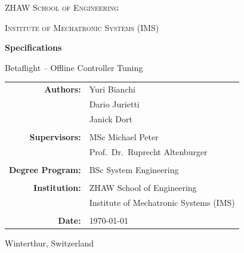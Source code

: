 \documentclass[a4paper,11pt,bibliography=totoc,listof=totoc]{scrreprt}
\begin{document}
\begin{titlepage}

\centering

\vspace*{2cm}

{\scshape\LARGE ZHAW School of Engineering \par}
\vspace{0.5cm}
{\scshape\Large Institute of Mechatronic Systems (IMS)\par}

\vspace{2.5cm}

{\huge\bfseries Specifications\par}

\vspace{0.5cm}

{\Large Betaflight – Offline Controller Tuning\par}


\begin{tabular}{rl}
\textbf{Authors:} & Yuri Bianchi \\
                  & Dario Jurietti \\
                  & Janick Dort \\
\\
\textbf{Supervisors:} & MSc Michael Peter \\
                      & Prof.\ Dr.\ Ruprecht Altenburger \\
\\
\textbf{Degree Program:} & BSc System Engineering \\
\\
\textbf{Institution:} & ZHAW School of Engineering \\
                      & Institute of Mechatronic Systems (IMS) \\
\\
\textbf{Date:} & \today \\
\end{tabular}
\vfill


\vspace{1cm}

Winterthur, Switzerland

\end{titlepage}

\tableofcontents
\end{document}

